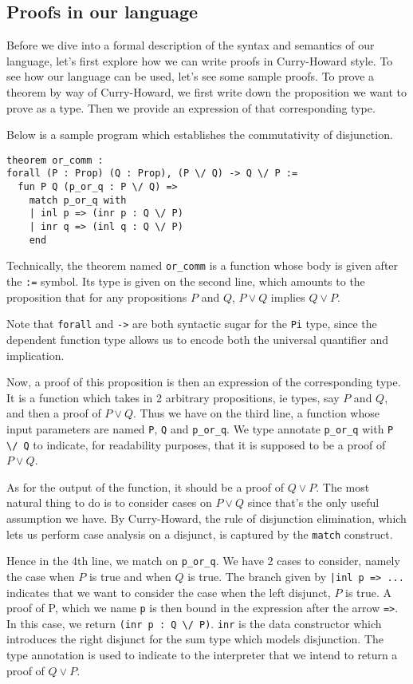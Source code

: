 \documentclass{article}
\begin{document}
\subsection{Proofs in our language}
Before we dive into a formal description of the syntax and semantics of our
language, let's first explore how we can write proofs in Curry-Howard style.
To see how our language can be used, let's see some sample proofs.
To prove a theorem by way of Curry-Howard, we first write down the proposition
we want to prove as a type. Then we provide an expression of that corresponding
type.

Below is a sample program which establishes the commutativity of disjunction. 
\begin{verbatim}
theorem or_comm :
forall (P : Prop) (Q : Prop), (P \/ Q) -> Q \/ P :=
  fun P Q (p_or_q : P \/ Q) =>
    match p_or_q with
    | inl p => (inr p : Q \/ P)
    | inr q => (inl q : Q \/ P)
    end
\end{verbatim}

Technically, the theorem named \verb|or_comm| is a function whose body is given
after the \verb|:=| symbol. Its type is given on the second line, which amounts
to the proposition that for any propositions $P$ and $Q$, $P \vee Q$ implies 
$Q \vee P$.

Note that \verb|forall| and \verb|->| are both
syntactic sugar for the \verb|Pi| type, since the dependent function type
allows us to encode both the universal quantifier and implication.

Now, a proof of this proposition is then an expression of the corresponding type.
It is a function which takes in 2 arbitrary propositions, ie types, say
$P$ and $Q$, and then a proof of $P \vee Q$. 
Thus we have on the third line, a function whose input parameters are named
\verb|P|, \verb|Q| and \verb|p_or_q|. We type annotate \verb|p_or_q| with
\verb|P \/ Q| to indicate, for readability purposes, that it is supposed to be
a proof of $P \vee Q$.

As for the output of the function, it should be a proof of $Q \vee P$. The
most natural thing to do is to consider cases on $P \vee Q$ since that's the
only useful assumption we have.
By Curry-Howard, the rule of disjunction elimination, which lets us perform
case analysis on a disjunct, is captured by the \verb|match| construct.

Hence in the 4th line, we match on \verb|p_or_q|. We have 2 cases to consider,
namely the case when $P$ is true and when $Q$ is true.
The branch given by \verb#|inl p => ...# indicates that we want to consider the
case when the left disjunct, $P$ is true. A proof of P, which we name \verb|p|
is then bound in the expression after the arrow \verb|=>|.
In this case, we return \verb|(inr p : Q \/ P)|. \verb|inr| is the data constructor
which introduces the right disjunct for the sum type which models disjunction.
The type annotation is used to indicate to the interpreter that we intend to
return a proof of $Q \vee P$.
\end{document}
